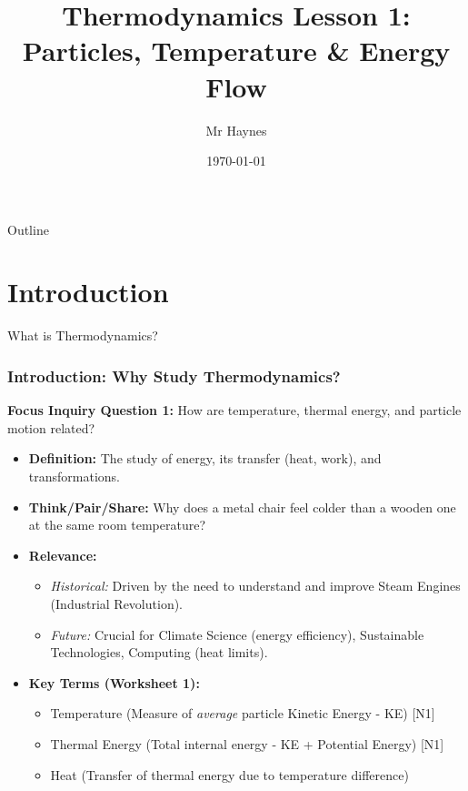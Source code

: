 \documentclass[xcolor=svgnames]{beamer}
\title[Thermo: Particles \& Energy]{Thermodynamics Lesson 1: Particles, Temperature \& Energy Flow}
\author[P. Haynes]{Mr Haynes}
\institute[GHS]{Gosford High School}
\date{\today} %
\begin{document}
\begin{frame}
    \titlepage
\end{frame}

\begin{frame}{Outline}
    \tableofcontents
\end{frame}

\section{Introduction}
\begin{frame}{What is Thermodynamics?}
    \frametitle{Introduction: Why Study Thermodynamics?}
    \textbf{Focus Inquiry Question 1:} How are temperature, thermal energy, and particle motion related?
    \vspace{1em}

    \begin{itemize}
        \item \textbf{Definition:} The study of energy, its transfer (heat, work), and transformations.
        \item \textbf{Think/Pair/Share:} Why does a metal chair feel colder than a wooden one at the same room temperature?
        \vspace{1em}
        \item \textbf{Relevance:}
        \begin{itemize}
            \item \textit{Historical:} Driven by the need to understand and improve Steam Engines (Industrial Revolution).
            \item \textit{Future:} Crucial for Climate Science (energy efficiency), Sustainable Technologies, Computing (heat limits).
        \end{itemize}
        \item \textbf{Key Terms (Worksheet 1):}
        \begin{itemize}
            \item Temperature (Measure of \textit{average} particle Kinetic Energy - KE) [N1]
            \item Thermal Energy (Total internal energy - KE + Potential Energy) [N1]
            \item Heat (Transfer of thermal energy due to temperature difference)
        \end{itemize}
    \end{itemize}
\end{frame}
\end{document}
